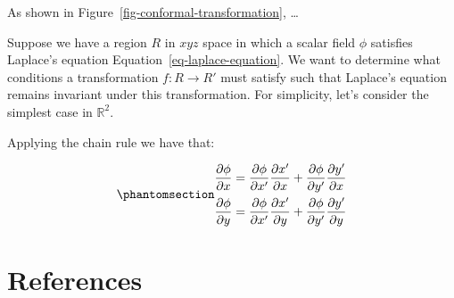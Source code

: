 \documentclass[
  12pt,
  letterpaper,
]{book}
\begin{document}
As shown in Figure~\ref{fig-conformal-transformation}, \ldots{}

Suppose we have a region \(R\) in \(xyz\) space in which a scalar field
\(\phi\) satisfies Laplace's equation
Equation~\ref{eq-laplace-equation}. We want to determine what conditions
a transformation \(f: R \rightarrow R'\) must satisfy such that
Laplace's equation remains invariant under this transformation. For
simplicity, let's consider the simplest case in \(\mathbb{R}^2\).

Applying the chain rule we have that:

\begin{equation}\phantomsection\label{eq-first-derivative-chain-rule}{
\begin{aligned}
\frac{\partial \phi}{\partial x} &=
\frac{\partial \phi}{\partial x'} \frac{\partial x'}{\partial x}
+
\frac{\partial \phi}{\partial y'} \frac{\partial y'}{\partial x} \\
\frac{\partial \phi}{\partial y} &=
\frac{\partial \phi}{\partial x'} \frac{\partial x'}{\partial y}
+
\frac{\partial \phi}{\partial y'} \frac{\partial y'}{\partial y}
\end{aligned}
}\end{equation}


\chapter*{References}\label{references}

\end{document}
